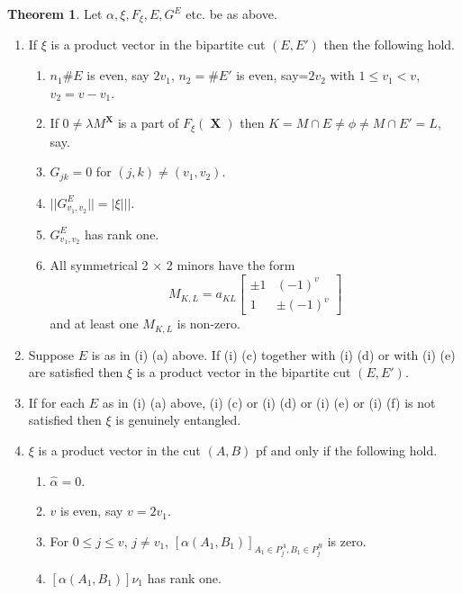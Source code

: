 \documentclass[a4paper,12pt]{article}
\DeclareMathOperator{\x}{\mathrm{X}}
\theoremstyle{definition}
\theoremstyle{underlinethm}
\newtheorem{thm}{Theorem}[section]
\theoremstyle{definition}
\begin{document}
\begin{thm}\label{thm-4.2}
Let $\alpha, \xi, F_{\xi}, E , G^{E}$ etc. be as above.
\begin{enumerate}[label=(\roman*)]
 \item If $\xi$ is a product vector in the bipartite cut $(E, E')$ then the following hold.
\begin{enumerate}[label= (\alph*)]
\item $n_{1}\# E$ is even, say $2v_{1}$, $n_{2}= \# E'$ is even, say=$2v_{2}$ with $1 \leq v_{1} < v$, $v_{2}= v-v_{1}$.

\item If $0 \neq \lambda M^{\boldsymbol{\x}}$ is a part of $F_{\xi}(\boldsymbol{\x})$ then $K = M \cap E \neq  \phi \neq M \cap E' = L$, say.

\item $G_{jk} =0$ for $(j,k) \neq (v_{1}, v_{2})$.

\item $||G_{v_{1}, v_{2}}^{E}||= |\xi |||$.

\item $G_{v_{1}, v_{2}}^{E}$ has rank one.

\item All symmetrical 2 $\times$ 2 minors have the form 
$$
M_{K, L} = a_{K L} \begin{bmatrix}\pm 1 & (-1)^{v}\\ 1  & \pm(-1)^{v} \end{bmatrix}
$$
and at least one $M_{K, L}$ is non-zero.
\end{enumerate}

\item Suppose $E$ is as in (i) (a) above. If (i) (c) together with (i) (d) or with (i) (e) are satisfied then $\xi$ is a product vector in the bipartite cut $(E, E')$.

\item If for each $E$ as in (i) (a) above, (i) (c) or (i) (d) or (i) (e) or (i) (f) is not satisfied then $\xi$ is genuinely entangled.

\item $\xi$ is a product vector in the cut $(A, B)$ pf and only if the following hold.

\begin{enumerate}[label= (\alph*)]
\item $\hat{\alpha} = 0$.

\item $v$ is even, say $v=2v_{1}$.

\item For $0 \leq j \leq v$, $j \neq v_{1}$, $[\alpha(A_{1}, B_{1})]_{A_{1} \in P_{j}^{A}, B_{1}\in P_{j}^{B}}$ is zero.

\item $[\alpha(A_{1}, B_{1})] \nu_{1}$  has rank one.

\end{enumerate}

 
\end{enumerate}



\end{thm}
\end{document}
